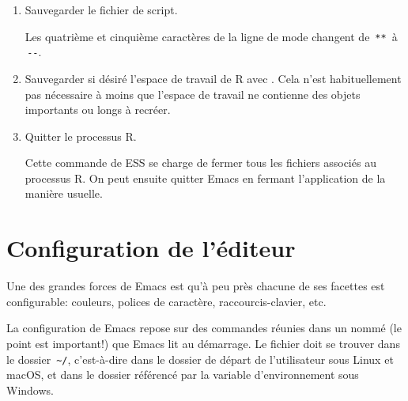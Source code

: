 \begin{enumerate}
\begin{trivlist}
    \hfill
  \end{trivlist}
\item Sauvegarder le fichier de script.
  Les quatrième et cinquième caractères de la ligne de mode changent
  de \,\verb|**|\, à \,\verb|--|.
\item Sauvegarder si désiré l'espace de travail de R avec
  . Cela n'est
  habituellement pas nécessaire à moins que l'espace de travail ne
  contienne des objets importants ou longs à recréer.
\item Quitter le processus R.
  Cette commande de ESS se charge de fermer tous les fichiers associés
  au processus R. On peut ensuite quitter Emacs en fermant
  l'application de la manière usuelle.
\end{enumerate}



\section{Configuration de l'éditeur}
\label{sec:emacs+ess:configuration}

Une des grandes forces de Emacs est qu'à peu près chacune de ses
facettes est configurable: couleurs, polices de caractère,
raccourcis-clavier, etc.

La configuration de Emacs repose sur des commandes réunies dans un
nommé  (le point est important!) que Emacs lit au
démarrage. Le fichier  doit se trouver dans le dossier
\,\verb=~/=, c'est-à-dire dans le dossier de départ de l'utilisateur
sous Linux et macOS, et dans le dossier référencé par la variable
d'environnement  sous Windows.

